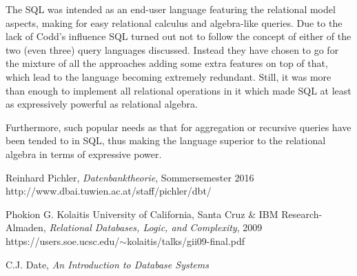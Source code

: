 \documentclass[12pt]{article}
\begin{document}
The SQL was intended as an end-user language featuring the relational model aspects, making for easy relational calculus
and algebra-like queries. Due to the lack of Codd's influence SQL turned out not to follow the concept of either of the 
two (even three) query languages discussed. Instead they have chosen to go for the mixture of all the approaches adding
some extra features on top of that, which lead to the language becoming extremely redundant.
Still, it was more than enough to implement all
relational operations in it which made SQL at least as expressively powerful as relational algebra.

Furthermore, such popular needs as that for aggregation or recursive queries have been tended to in SQL, thus
making the language superior to the relational algebra in terms of expressive power.

\begin{thebibliography}{9}

  Reinhard Pichler,
  \emph{Datenbanktheorie}, Sommersemester 2016
	http://www.dbai.tuwien.ac.at/staff/pichler/dbt/

  Phokion G. Kolaitis University of California, Santa Cruz \& IBM Research-Almaden,
  \emph{Relational Databases, Logic, and Complexity}, 2009
	https://users.soe.ucsc.edu/$\sim$kolaitis/talks/gii09-final.pdf

  C.J. Date,
  \emph{An Introduction to Database Systems}


\end{thebibliography}
\end{document}
